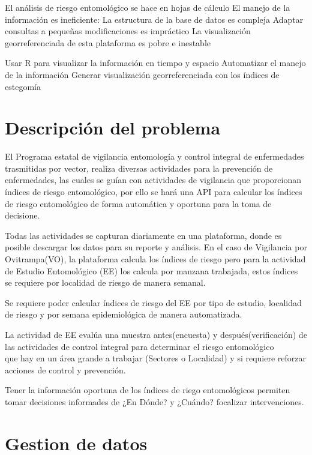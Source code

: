 \documentclass[
  letterpaper,
]{scrbook}
\begin{document}
El análisis de riesgo entomológico se hace en hojas de cálculo El manejo
de la información es ineficiente: La estructura de la base de datos es
compleja Adaptar consultas a pequeñas modificaciones es impráctico La
visualización georreferenciada de esta plataforma es pobre e inestable

Usar R para visualizar la información en tiempo y espacio Automatizar el
manejo de la información Generar visualización georreferenciada con los
índices de estegomía

\section{Descripción del problema}\label{descripciuxf3n-del-problema}

El Programa estatal de vigilancia entomología y control integral de
enfermedades trasmitidas por vector, realiza diversas actividades para
la prevención de enfermedades, las cuales se guían con actividades de
vigilancia que proporcionan índices de riesgo entomológico, por ello se
hará una API para calcular los índices de riesgo entomológico de forma
automática y oportuna para la toma de decisione.

Todas las actividades se capturan diariamente en una plataforma, donde
es posible descargar los datos para su reporte y análisis. En el caso de
Vigilancia por Ovitrampa(VO), la plataforma calcula los índices de
riesgo pero para la actividad de Estudio Entomológico (EE) los calcula
por manzana trabajada, estos índices se requiere por localidad de riesgo
de manera semanal.

Se requiere poder calcular índices de riesgo del EE por tipo de estudio,
localidad de riesgo y por semana epidemiológica de manera automatizada.

La actividad de EE evalúa una muestra antes(encuesta) y
después(verificación) de las actividades de control integral para
determinar el riesgo entomológico\\
que hay en un área grande a trabajar (Sectores o Localidad) y si
requiere reforzar acciones de control y prevención.

Tener la información oportuna de los índices de riego entomológicos
permiten tomar decisiones informades de ¿En Dónde? y ¿Cuándo? focalizar
intervenciones.

\section{Gestion de datos}\label{gestion-de-datos}
\end{document}
